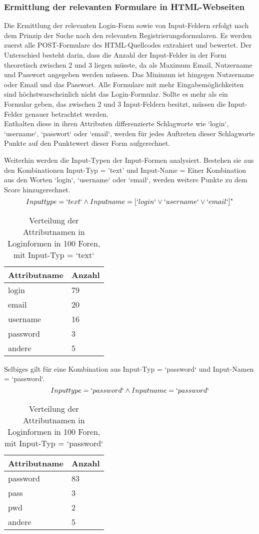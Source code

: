 \subsubsection{Ermittlung der relevanten Formulare in HTML-Webseiten}
Die Ermittlung der relevanten Login-Form sowie von Input-Feldern erfolgt nach dem Prinzip der Suche nach den relevanten Registrierungsformularen. Es werden zuerst alle POST-Formulare des HTML-Quellcodes extrahiert und bewertet. Der Unterschied besteht darin, dass die Anzahl der Input-Felder in der Form theoretisch zwischen 2 und 3 liegen müsste, da als Maximum Email, Nutzername und Passwort angegeben werden müssen. Das Minimum ist hingegen Nutzername oder Email und das Passwort. Alle Formulare mit mehr Eingabemöglichkeiten sind höchstwarscheinlich nicht das Login-Formular.
Sollte es mehr als ein Formular geben, das zwischen 2 und 3 Input-Feldern besitzt, müssen die Input-Felder genauer betrachtet werden. \\
Enthalten diese in ihren Attributen differenzierte Schlagworte wie `login`, `username`, `passwort` oder `email`, werden für jedes Auftreten dieser Schlagworte Punkte auf den Punktewert dieser Form aufgerechnet.


Weiterhin werden die Input-Typen der Input-Formen analysiert. Bestehen sie aus den Kombinationen Input-Typ = 'text' und Input-Name = Einer Kombination aus den Worten `login`, `username` oder `email`, werden weitere Punkte zu dem Score hinzugerechnet.
\[Inputtype = `text` \wedge Inputname = [`login` \vee `username` \vee `email`]^*\]

\begin{table}[h!]
\centering 
\begin{tabular}{ | p{3cm} | p{3cm}|} \hline
Attributname & Anzahl \\ \hline
login & 79 \\ \hline
email & 20 \\ \hline
username & 16 \\ \hline
password & 3 \\ \hline
andere & 5 \\ \hline
\end{tabular}
\caption{Verteilung der Attributnamen in Loginformen in 100 Foren, mit Input-Typ = `text`}
\end{table}



Selbiges gilt für eine Kombination aus Input-Typ = `password` und Input-Namen = `password`.
\[Inputtype = `password` \wedge Inputname = `password`\]
\newpage
\begin{table}[h!]
\centering 
\begin{tabular}{ | p{3cm} | p{3cm}|} \hline
Attributname & Anzahl \\ \hline
password & 83 \\ \hline
pass & 3 \\ \hline
pwd & 2 \\ \hline
andere & 5 \\ \hline
\end{tabular}
\caption{Verteilung der Attributnamen in Loginformen in 100 Foren, mit Input-Typ = `password`}
\end{table}

